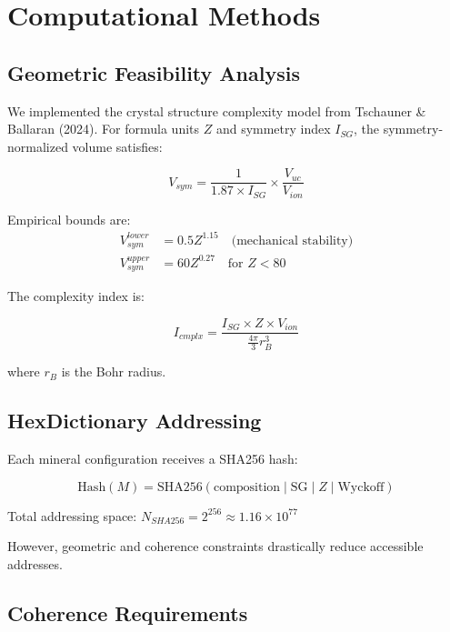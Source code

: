 \documentclass[11pt,a4paper]{article}
\begin{document}
\section{Computational Methods}

\subsection{Geometric Feasibility Analysis}

We implemented the crystal structure complexity model from Tschauner \& Ballaran (2024)\cite{tschauner2024}. For formula units $Z$ and symmetry index $I_{SG}$, the symmetry-normalized volume satisfies:

\begin{equation}
V_{sym} = \frac{1}{1.87 \times I_{SG}} \times \frac{V_{uc}}{V_{ion}}
\label{eq:Vsym}
\end{equation}

Empirical bounds are:
\begin{align}
V_{sym}^{lower} &= 0.5 Z^{1.15} \quad \text{(mechanical stability)} \\
V_{sym}^{upper} &= 60 Z^{0.27} \quad \text{for } Z < 80 \label{eq:upper_bound}
\end{align}

The complexity index is:

\begin{equation}
I_{cmplx} = \frac{I_{SG} \times Z \times V_{ion}}{\frac{4\pi}{3} r_B^3}
\label{eq:I_cmplx}
\end{equation}

where $r_B$ is the Bohr radius.

\subsection{HexDictionary Addressing}

Each mineral configuration receives a SHA256 hash:

\begin{equation}
\text{Hash}(M) = \text{SHA256}(\text{composition} \mid \text{SG} \mid Z \mid \text{Wyckoff})
\end{equation}

Total addressing space: $N_{SHA256} = 2^{256} \approx 1.16 \times 10^{77}$

However, geometric and coherence constraints drastically reduce accessible addresses.

\subsection{Coherence Requirements}
\end{document}
